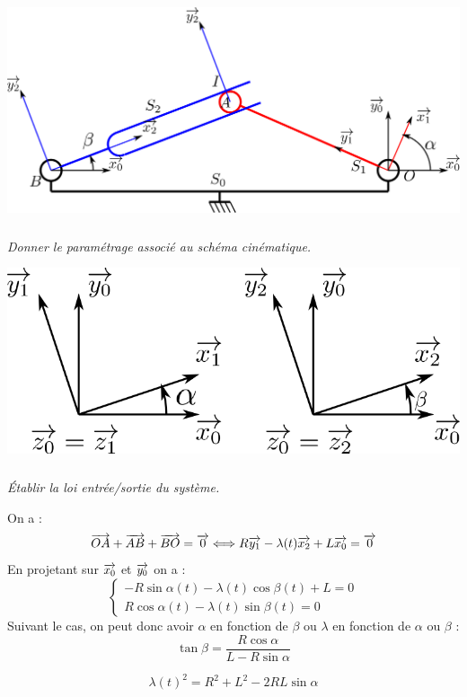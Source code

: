 \documentclass[10pt,fleqn]{article} %
\begin{document}
\begin{multicols}{2}
\begin{center}
 \includegraphics[width=\linewidth]{images/schema1}
\end{center}



\subparagraph{}
\textit{Donner le paramétrage associé au schéma cinématique.}

\ifprof%
\begin{corrige}
\begin{center}
 \includegraphics[width=.4\linewidth]{images/param1}
\end{center}
\end{corrige}
\else \fi

\subparagraph{}
\textit{\'Etablir la loi entrée/sortie du système.}


\ifprof%
\begin{corrige}

On a :
$$ \overrightarrow{OA} + \overrightarrow{AB} + \overrightarrow{BO} = \overrightarrow{0} \Longleftrightarrow 
R\overrightarrow{y_1} - \lambda(t)\overrightarrow{x_2} + L \overrightarrow{x_0} = \overrightarrow{0}
$$
En projetant sur $\overrightarrow{x_0}$ et $\overrightarrow{y_0}$ on a :
$$
\left\{
\begin{array}{l}
- R \sin \alpha(t) - \lambda(t) \cos\beta(t) + L = 0\\
R\cos\alpha(t) - \lambda(t)\sin \beta(t)=0
\end{array}
\right.
$$
Suivant le cas, on peut donc avoir $\alpha$ en fonction de $\beta$ ou $\lambda$ en fonction de $\alpha$ ou $\beta$ :
$$
\tan \beta = \dfrac{R\cos\alpha}{L-R\sin\alpha}
$$

$$
\lambda(t)^2 = R^2 + L^2 - 2RL \sin\alpha
$$
\end{corrige}
\else \fi


\end{multicols}
\end{document}
